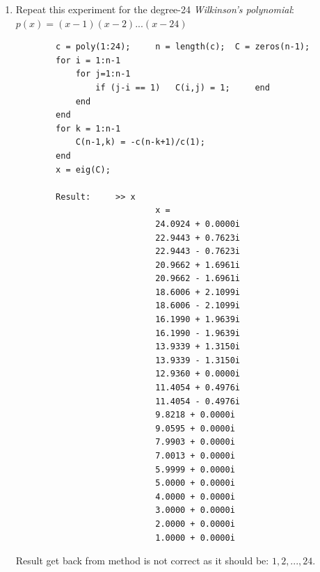 \documentclass[14pt,a4paper]{article}
\begin{document}
\begin{enumerate}
\begin{lstlisting}
	\end{lstlisting}
	
	\label{5c}
	\item Repeat this experiment for the degree-24 \textit{Wilkinson's polynomial}:\\
	\hspace*{4cm} $ p(x) = (x-1)(x-2)...(x-24)$
	\begin{lstlisting}
		c = poly(1:24);		n = length(c);	C = zeros(n-1);
		for i = 1:n-1
			for j=1:n-1
				if (j-i == 1)	C(i,j) = 1;		end
			end
		end
		for k = 1:n-1
			C(n-1,k) = -c(n-k+1)/c(1);
		end
		x = eig(C);
		
		Result:		>> x
							x =
							24.0924 + 0.0000i
							22.9443 + 0.7623i
							22.9443 - 0.7623i
							20.9662 + 1.6961i
							20.9662 - 1.6961i
							18.6006 + 2.1099i
							18.6006 - 2.1099i
							16.1990 + 1.9639i
							16.1990 - 1.9639i
							13.9339 + 1.3150i
							13.9339 - 1.3150i
							12.9360 + 0.0000i
							11.4054 + 0.4976i
							11.4054 - 0.4976i
							9.8218 + 0.0000i
							9.0595 + 0.0000i
							7.9903 + 0.0000i
							7.0013 + 0.0000i
							5.9999 + 0.0000i
							5.0000 + 0.0000i
							4.0000 + 0.0000i
							3.0000 + 0.0000i
							2.0000 + 0.0000i
							1.0000 + 0.0000i
	\end{lstlisting}
	Result get back from method is not correct as it should be: $1,2,...,24$.
	

\end{enumerate}
\end{document}
